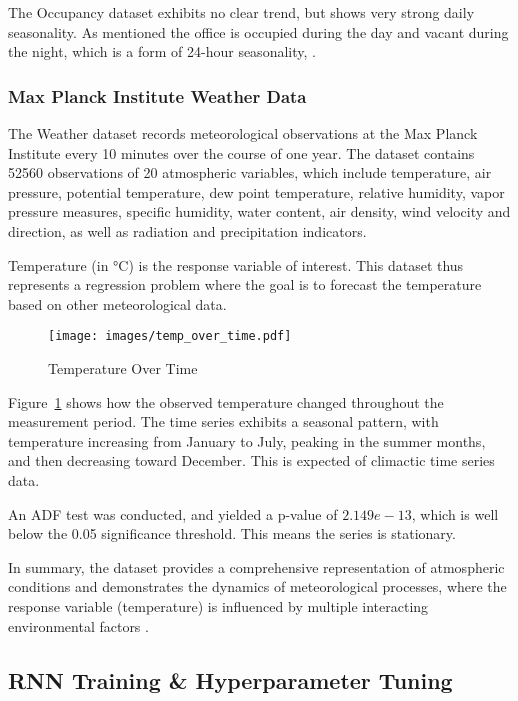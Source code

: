 \documentclass[conference]{IEEEtran}
\begin{document}
The Occupancy dataset exhibits no clear trend, but shows very strong daily seasonality. As mentioned the office is occupied during the day and vacant during the night, which is a form of 24-hour seasonality, \cite{occupancy_detection}.

\subsubsection{\textbf{Max Planck Institute Weather Data}}

The Weather dataset records meteorological observations at the Max Planck Institute every 10 minutes over the course of one year. The dataset contains 52560 observations of 20 atmospheric variables, which include temperature, air pressure, potential temperature, dew point temperature, relative humidity, vapor pressure measures, specific humidity, water content, air density, wind velocity and direction, as well as radiation and precipitation indicators. 

Temperature (in \si{\celsius}) is the response variable of interest. This dataset thus represents a regression problem where the goal is to forecast the temperature based on other meteorological data.

\begin{figure}[H]
    \centering
    \texttt{[image: images/temp\_over\_time.pdf]}
    \caption{Temperature Over Time}
    \label{fig:temp_over_time}
\end{figure}

Figure~\ref{fig:temp_over_time} shows how the observed temperature changed throughout the measurement period. The time series exhibits a seasonal pattern, with temperature increasing from January to July, peaking in the summer months, and then decreasing toward December. This is expected of climactic time series data.

An ADF test was conducted, and yielded a p-value of $2.149e-13$, which is well below the 0.05 significance threshold. This means the series is stationary.

In summary, the dataset provides a comprehensive representation of atmospheric conditions and demonstrates the dynamics of meteorological processes, where the response variable (temperature) is influenced by multiple interacting environmental factors \cite{weather_dataset}.

\subsection{\textbf{RNN Training \& Hyperparameter Tuning}}
\end{document}
